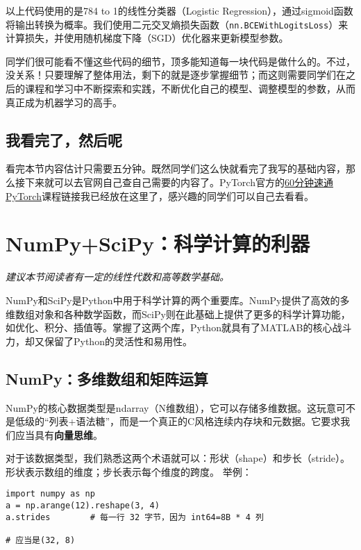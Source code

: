 \documentclass[../main.tex]{subfiles}
\begin{document}
以上代码使用的是784 to 1的线性分类器（Logistic Regression），通过sigmoid函数将输出转换为概率。我们使用二元交叉熵损失函数（\texttt{nn.BCEWithLogitsLoss}）来计算损失，并使用随机梯度下降（SGD）优化器来更新模型参数。

同学们很可能看不懂这些代码的细节，顶多能知道每一块代码是做什么的。不过，没关系！只要理解了整体用法，剩下的就是逐步掌握细节；而这则需要同学们在之后的课程和学习中不断探索和实践，不断优化自己的模型、调整模型的参数，从而真正成为机器学习的高手。

\subsection{我看完了，然后呢}

看完本节内容估计只需要五分钟。既然同学们这么快就看完了我写的基础内容，那么接下来就可以去官网自己查自己需要的内容了。PyTorch官方的\href{https://docs.pytorch.org/tutorials/beginner/deep_learning_60min_blitz.html}{60分钟速通PyTorch}课程链接我已经放在这里了，感兴趣的同学们可以自己去看看。

\section{NumPy+SciPy：科学计算的利器}

\begin{flushright}
  \emph{建议本节阅读者有一定的线性代数和高等数学基础。}
\end{flushright}

NumPy和SciPy是Python中用于科学计算的两个重要库。NumPy提供了高效的多维数组对象和各种数学函数，而SciPy则在此基础上提供了更多的科学计算功能，如优化、积分、插值等。掌握了这两个库，Python就具有了MATLAB的核心战斗力，却又保留了Python的灵活性和易用性。

\subsection{NumPy：多维数组和矩阵运算}

NumPy的核心数据类型是ndarray（N维数组），它可以存储多维数据。这玩意可不是低级的“列表+语法糖”，而是一个真正的C风格连续内存块和元数据。它要求我们应当具有\textbf{向量思维}。

对于该数据类型，我们熟悉这两个术语就可以：形状（shape）和步长（stride）。形状表示数组的维度；步长表示每个维度的跨度。
举例：
\begin{lstlisting}
import numpy as np
a = np.arange(12).reshape(3, 4)
a.strides        # 每一行 32 字节，因为 int64=8B * 4 列

# 应当是(32, 8)
\end{lstlisting}
\end{document}
